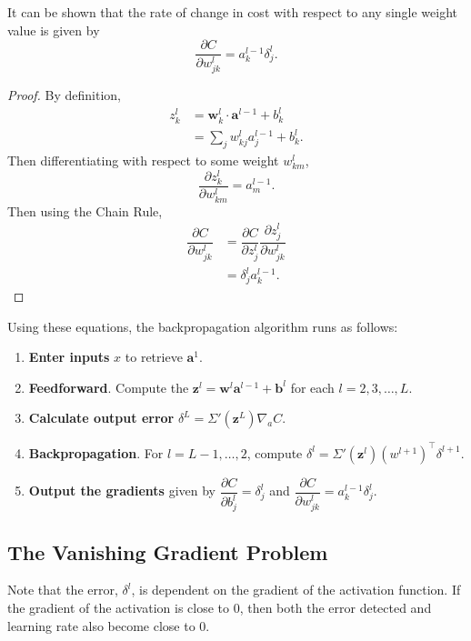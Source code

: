 \begin{proposition}
	It can be shown that the rate of change in cost with respect to any single weight value is given by
	\[
		\dfrac{\partial C}{\partial w_{jk}^l} = a_k^{l-1}\delta_j^l.
	\]
\end{proposition}
\begin{proof}
	By definition,
	\begin{align*}
		z_k^l & = \mathbf{w}_k^l\cdot\mathbf{a}^{l-1} + b_k^l \\
		& = \sum_jw_{kj}^la_j^{l-1} + b_k^l.
	\end{align*}
	Then differentiating with respect to some weight $w_{km}^l$,
	\[
		\dfrac{\partial z_k^l}{\partial w_{km}^l} = a_m^{l-1}.
	\]
	Then using the Chain Rule,
	\begin{align*}	
		\dfrac{\partial C}{\partial w_{jk}^l} & = \dfrac{\partial C}{\partial z_j^l}\dfrac{\partial z_j^l}{\partial w_{jk}^l} \\
		& = \delta_j^l a_k^{l-1}.
	\end{align*}
\end{proof}


Using these equations, the backpropagation algorithm runs as follows:
\begin{enumerate}
	\item \textbf{Enter inputs }$x$ to retrieve $\mathbf{a}^1$.
	\item \textbf{Feedforward}. Compute the $\mathbf{z}^l = \mathbf{w}^l\mathbf{a}^{l-1} + \mathbf{b}^l$ for each $l = 2, 3,\ldots,L$.
	\item \textbf{Calculate output error }$\delta^L = \Sigma'(\mathbf{z}^L)\nabla_aC$.
	\item \textbf{Backpropagation}. For $l = L-1, \ldots, 2$, compute $\delta^l =  \Sigma'(\mathbf{z}^l)(w^{l+1})^\top\delta^{l+1}$.
	\item \textbf{Output the gradients} given by $\dfrac{\partial C}{\partial b_j^l} = \delta_j^l$ and $\dfrac{\partial C}{\partial w_{jk}^l} = a_k^{l-1}\delta_j^l$.
\end{enumerate}


\subsection{The Vanishing Gradient Problem}\label{nnet-vanishinggradprob}
Note that the error, $\delta^l$, is dependent on the gradient of the activation function. If the gradient of the activation is close to 0, then both the error detected and learning rate also become close to 0.

